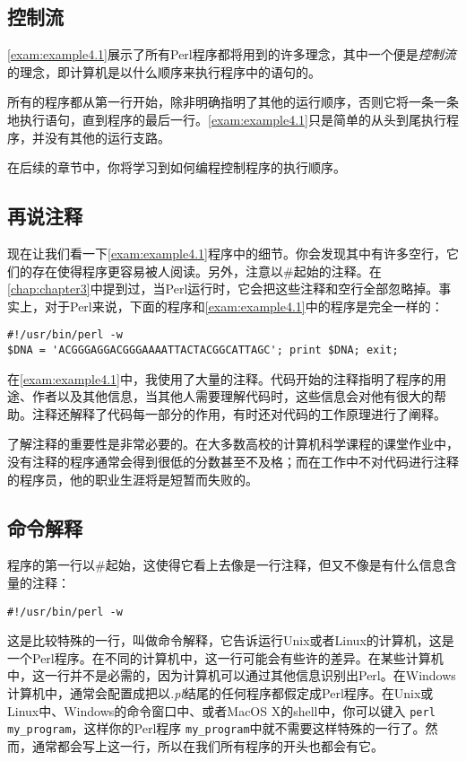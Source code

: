 \subsection{控制流}
\autoref{exam:example4.1}展示了所有Perl程序都将用到的许多理念，其中一个便是\textit{控制流}的理念，即计算机是以什么顺序来执行程序中的语句的。

所有的程序都从第一行开始，除非明确指明了其他的运行顺序，否则它将一条一条地执行语句，直到程序的最后一行。\autoref{exam:example4.1}只是简单的从头到尾执行程序，并没有其他的运行支路。

在后续的章节中，你将学习到如何编程控制程序的执行顺序。

\subsection{再说注释}
现在让我们看一下\autoref{exam:example4.1}程序中的细节。你会发现其中有许多空行，它们的存在使得程序更容易被人阅读。另外，注意以\#起始的注释。在\autoref{chap:chapter3}中提到过，当Perl运行时，它会把这些注释和空行全部忽略掉。事实上，对于Perl来说，下面的程序和\autoref{exam:example4.1}中的程序是完全一样的：

\begin{lstlisting}
#!/usr/bin/perl -w
$DNA = 'ACGGGAGGACGGGAAAATTACTACGGCATTAGC'; print $DNA; exit;
\end{lstlisting}

在\autoref{exam:example4.1}中，我使用了大量的注释。代码开始的注释指明了程序的用途、作者以及其他信息，当其他人需要理解代码时，这些信息会对他有很大的帮助。注释还解释了代码每一部分的作用，有时还对代码的工作原理进行了阐释。

了解注释的重要性是非常必要的。在大多数高校的计算机科学课程的课堂作业中，没有注释的程序通常会得到很低的分数甚至不及格；而在工作中不对代码进行注释的程序员，他的职业生涯将是短暂而失败的。

\subsection{命令解释}
\label{sec:section4.2.3}
程序的第一行以\#起始，这使得它看上去像是一行注释，但又不像是有什么信息含量的注释：

\begin{lstlisting}
#!/usr/bin/perl -w
\end{lstlisting}

这是比较特殊的一行，叫做命令解释，它告诉运行Unix或者Linux的计算机，这是一个Perl程序。在不同的计算机中，这一行可能会有些许的差异。在某些计算机中，这一行并不是必需的，因为计算机可以通过其他信息识别出Perl。在Windows计算机中，通常会配置成把以\textit{.pl}结尾的任何程序都假定成Perl程序。在Unix或Linux中、Windows的命令窗口中、或者MacOS X的shell中，你可以键入 \verb|perl my_program|，这样你的Perl程序 \verb|my_program|中就不需要这样特殊的一行了。然而，通常都会写上这一行，所以在我们所有程序的开头也都会有它。

